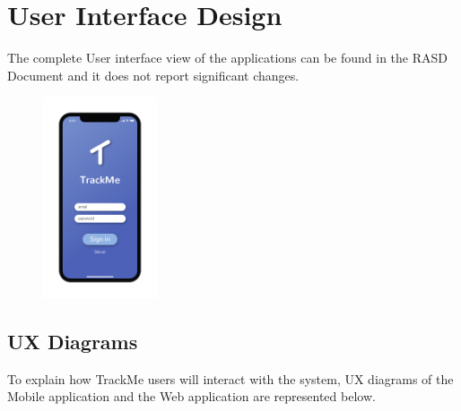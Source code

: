 \chapter{User Interface Design}
The complete User interface view of the applications can be found in the RASD Document and it does not report significant changes.

\begin{figure}[H]

    \centering
   
\end{figure}

\begin{figure}[H]

    \centering
    \includegraphics[width=0.30\textwidth]{./Pictures/Mockup/mobile/login.png}
    
\end{figure}

\section{UX Diagrams}
To explain how TrackMe users will interact with the system, UX diagrams of the Mobile application and the Web application are represented below.

